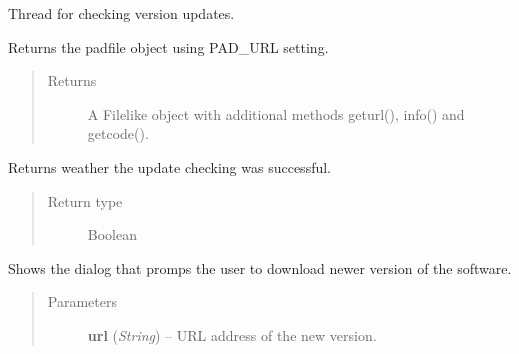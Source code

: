 \documentclass[letterpaper,10pt,english]{sphinxmanual}
\begin{document}
\begin{fulllineitems}
\label{threads:threads.checkupdate.CHECK_UPDATE}
Thread for checking version updates.

\begin{fulllineitems}
\label{threads:threads.checkupdate.CHECK_UPDATE.get_pad}
Returns the padfile object using PAD\_URL setting.
\begin{quote}\begin{description}
\item[{Returns}] \leavevmode
A Filelike object with additional methods geturl(), info() and
getcode().

\end{description}\end{quote}

\end{fulllineitems}


\begin{fulllineitems}
\label{threads:threads.checkupdate.CHECK_UPDATE.run}
Returns weather the update checking was successful.
\begin{quote}\begin{description}
\item[{Return type}] \leavevmode
Boolean

\end{description}\end{quote}

\end{fulllineitems}


\begin{fulllineitems}
\label{threads:threads.checkupdate.CHECK_UPDATE.show_dialog}
Shows the dialog that promps the user to download newer version of
the software.
\begin{quote}\begin{description}
\item[{Parameters}] \leavevmode
\textbf{url} (\emph{String}) -- URL address of the new version.

\end{description}\end{quote}

\end{fulllineitems}


\end{fulllineitems}
\end{document}
